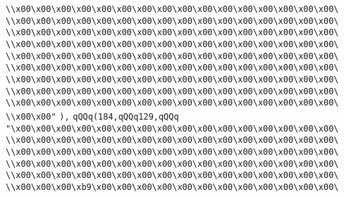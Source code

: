 \verb|\\x00\x00\x00\x00\x00\x00\x00\x00\x00\x00\x00\x00\x00\x00\x00\x00\|\newline
\verb|\\x00\x00\x00\x00\x00\x00\x00\x00\x00\x00\x00\x00\x00\x00\x00\x00\|\newline
\verb|\\x00\x00\x00\x00\x00\x00\x00\x00\x00\x00\x00\x00\x00\x00\x00\x00\|\newline
\verb|\\x00\x00\x00\x00\x00\x00\x00\x00\x00\x00\x00\x00\x00\x00\x00\x00\|\newline
\verb|\\x00\x00\x00\x00\x00\x00\x00\x00\x00\x00\x00\x00\x00\x00\x00\x00\|\newline
\verb|\\x00\x00\x00\x00\x00\x00\x00\x00\x00\x00\x00\x00\x00\x00\x00\x00\|\newline
\verb|\\x00\x00\x00\x00\x00\x00\x00\x00\x00\x00\x00\x00\x00\x00\x00\x00\|\newline
\verb|\\x00\x00\x00\x00\x00\x00\x00\x00\x00\x00\x00\x00\x00\x00\x00\x00\|\newline
\verb|\\x00\x00\x00\x00\x00\x00\x00\x00\x00\x00\x00\x00\x00\x00\x00\x00\|\newline
\verb|\\x00\x00"|\newline
\verb|),|\newline
\verb|qQQq(184,qQQq129,qQQq|\newline
\verb|"\x00\x00\x00\x00\x00\x00\x00\x00\x00\x00\x00\x00\x00\x00\x00\x00\|\newline
\verb|\\x00\x00\x00\x00\x00\x00\x00\x00\x00\x00\x00\x00\x00\x00\x00\x00\|\newline
\verb|\\x00\x00\x00\x00\x00\x00\x00\x00\x00\x00\x00\x00\x00\x00\x00\x00\|\newline
\verb|\\x00\x00\x00\x00\x00\x00\x00\x00\x00\x00\x00\x00\x00\x00\x00\x00\|\newline
\verb|\\x00\x00\x00\x00\x00\x00\x00\x00\x00\x00\x00\x00\x00\x00\x00\x00\|\newline
\verb|\\x00\x00\x00\xb9\x00\x00\x00\x00\x00\x00\x00\x00\x00\x00\x00\x00\|\newline
